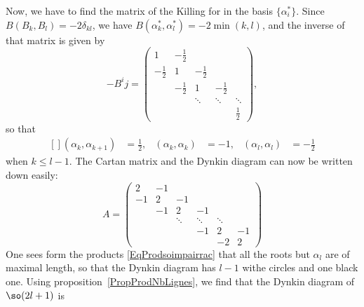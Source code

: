 Now, we have to find the matrix of the Killing for in the basis $\{ \alpha_i^* \}$. Since $B(B_k,B_l)=-2\delta_{kl}$, we have $B(\alpha_k^*,\alpha_l^*)=-2\min(k,l)$, and the inverse of that matrix is given by
\begin{equation}
	-B^ij=
	\begin{pmatrix}
		1		& -\frac{ 1 }{2}\\
		-\frac{ 1 }{2}	& 1			& -\frac{ 1 }{2}\\
		& -\frac{ 1 }{2}	& 1			&-\frac{ 1 }{2}\\
		&& \ddots		& \ddots		& \ddots\\
		&&			&			&	\frac{ 1 }{2}
	\end{pmatrix},
\end{equation}
so that
\begin{equation}		\label{EqProdsoimpairrac}
	\begin{aligned}[]
		(\alpha_k,\alpha_{k+1})&=\frac{ 1 }{2},	&	(\alpha_k,\alpha_k)&=-1,	&(\alpha_l,\alpha_l)&=-\frac{ 1 }{2}
	\end{aligned}
\end{equation}
when $k\leq l-1$. The Cartan matrix and the Dynkin diagram can now be written down easily:
\begin{equation}		\label{EqCartanSOimpair}
	A=
	\begin{pmatrix}
		2	& -1\\
		-1	& 2	& -1\\
		& -1	& 2		& -1\\
		&	& \ddots	& \ddots	& \ddots\\
		&	&		& -1		& 2	& -1\\
		&	&		& 		& -2	& 2
	\end{pmatrix}
\end{equation}
One sees form the products \eqref{EqProdsoimpairrac} that all the roots but $\alpha_l$ are of maximal length, so that the Dynkin diagram has $l-1$ withe circles and one black one. Using proposition~\ref{PropProdNbLignes}, we find that the Dynkin diagram of $\so(2l+1)$ is
%	
\begin{equation}
   
\end{equation}

